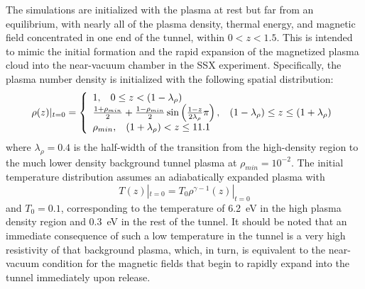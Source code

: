 The simulations are initialized with the plasma at rest but far from an equilibrium, with nearly all of the plasma density, thermal energy, and magnetic field concentrated in one end of the tunnel, within $0 < z < 1.5$. This is intended to mimic the initial formation and the rapid expansion of the magnetized plasma cloud into the near-vacuum chamber in the SSX experiment. Specifically, the plasma number density is initialized with the following spatial distribution:
\begin{equation}
\rho(z)|_{t=0} = \left\{\begin{array}{l} 
1, \hspace{3mm} 0 \le z < (1 - \lambda_\rho) \\
\frac{1+\rho_{min}}{2} + \frac{1-\rho_{min}}{2}\sin\left(\frac{1-z}{2\lambda_\rho}\pi\right), \hspace{3mm} (1 - \lambda_\rho) \le z \le (1 + \lambda_\rho) \\
\rho_{min}, \hspace{3mm} (1 + \lambda_\rho) < z \le 11.1
\end{array}\right.
\end{equation}
where $\lambda_\rho=0.4$ is the half-width of the transition from the high-density region to the much lower density background tunnel plasma at $\rho_{min} = 10^{-2}$. The initial temperature distribution assumes an adiabatically expanded plasma with 
\begin{equation}
T(z)|_{t=0} = T_0\rho^{\gamma-1}(z)|_{t=0}
\end{equation}
and $T_0 = 0.1$, corresponding to the temperature of 6.2~eV in the high plasma density region and 0.3~eV in the rest of the tunnel. It should be noted that an immediate consequence of such a low temperature in the tunnel is a very high resistivity of that background plasma, which, in turn, is equivalent to the near-vacuum condition for the magnetic fields that begin to rapidly expand into the tunnel immediately upon release.

